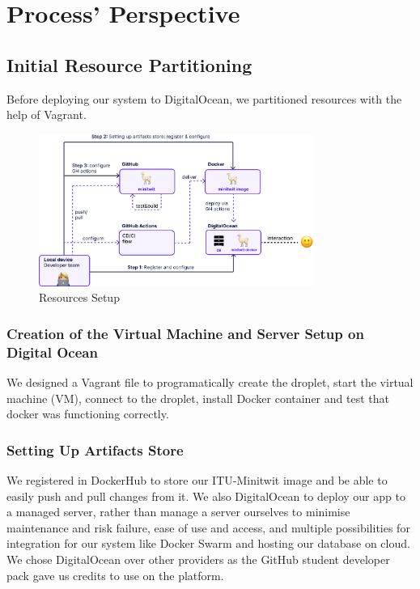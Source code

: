 \documentclass{article}
\begin{document}
\section{Process' Perspective}

\subsection{Initial Resource Partitioning}
Before deploying our system to DigitalOcean, we partitioned resources with the help of Vagrant.

\begin{figure}[ht]
    \centering
    \includegraphics[width=0.8\textwidth]{./images/resources_setup_v2.png} 
    \caption{Resources Setup}
    \label{fig:Resourse setup}
\end{figure}

\subsubsection{Creation of the Virtual Machine and Server Setup on Digital Ocean}
We designed a Vagrant file to programatically create the droplet, start the virtual machine (VM), connect to the droplet, install Docker container and test that docker was functioning correctly.

\subsubsection{Setting Up Artifacts Store}
We registered in DockerHub to store our ITU-Minitwit image and be able to easily push and pull changes from it. We also DigitalOcean to deploy our app to a managed server, rather than manage a server ourselves to minimise maintenance and risk failure, ease of use and access, and multiple possibilities for integration for our system like Docker Swarm and hosting our database on cloud. We chose DigitalOcean over other providers as the GitHub student developer pack gave us credits to use on the platform.
\end{document}
